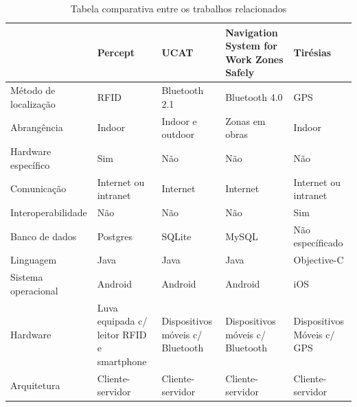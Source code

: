 \documentclass[english,brazilian]{UNISINOSmonografia}
\begin{document}
\FloatBarrier
\begin{table}
	\caption{Tabela comparativa entre os trabalhos relacionados}
	\label{tab:trabalalhosRelacionados}
	\centering%
	\begin{minipage}{1\textwidth}
		\begin{tabular}{ | p{3cm} | p{3cm} | p{3cm} | p{3cm} | p{3cm} | }
			\hline
										& Percept 									& UCAT 								& Navigation System for Work Zones Safely   & Tirésias   \\ \hline
				Método de localização 	& RFID 										& Bluetooth 2.1 					& Bluetooth 4.0 							& GPS 						 \\ \hline
				Abrangência 			& Indoor 									& Indoor e outdoor 					& Zonas em obras 							& Indoor 					 \\ \hline
				Hardware específico 	& Sim 										& Não 								& Não 										& Não 						 \\ \hline
				Comunicação 			& Internet ou intranet 						& Internet 							& Internet 									& Internet ou intranet 		 \\ \hline
				Interoperabilidade 		& Não 										& Não 								& Não 										& Sim 						 \\ \hline
				Banco de dados 			& Postgres 									& SQLite 							& MySQL 									& Não específicado 			 \\ \hline
				Linguagem 				& Java 										& Java 								& Java 										& Objective-C 				 \\ \hline
				Sistema operacional 	& Android 									& Android 							& Android 									& iOS 						 \\ \hline
				Hardware 				& Luva equipada c/ leitor RFID e smartphone & Dispositivos móveis c/ Bluetooth 	& Dispositivos móveis c/ Bluetooth 			& Dispositivos Móveis c/ GPS \\ \hline
				Arquitetura 			& Cliente-servidor 							& Cliente-servidor 					& Cliente-servidor 							& Cliente-servidor 			 \\ \hline
		\end{tabular}
	\end{minipage}
\end{table}
\FloatBarrier

\end{document}
